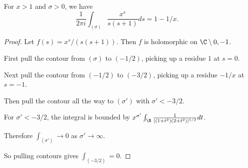 \begin{lemma}[formulaGtOne]
\label{formulaGtOne}
\leanok
For $x>1$ and $\sigma>0$, we have
  $$
  \frac1{2\pi i}
  \int_{(\sigma)}\frac{x^s}{s(s+1)}ds =1-1/x.
  $$
\end{lemma}
\begin{proof}
\leanok
Let $f(s) = x^s/(s(s+1))$. Then $f$ is holomorphic on $\C \setminus {0,-1}$.

First pull the contour from $(\sigma)$ to $(-1/2)$, picking up a residue $1$ at $s=0$.

Next pull the contour from $(-1/2)$ to $(-3/2)$, picking up a residue $-1/x$ at
  $s=-1$.

Then pull the contour all the way to $(\sigma')$ with $\sigma'<-3/2$.

For $\sigma' < -3/2$, the integral is bounded by
  $x^{\sigma'}\int_\R\frac{1}{|(1+t ^ 2)(2+t ^ 2)|^{1/2}}dt$.

Therefore $\int_{(\sigma')}\to 0$ as $\sigma'\to\infty$.

So pulling contours gives $\int_{(-3/2)}=0$.
\end{proof}
